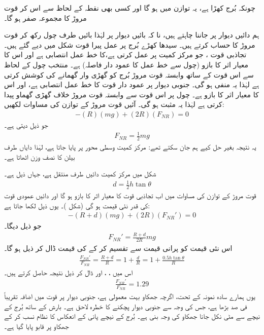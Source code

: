  چونکہ بُرج کھڑا ہے، یہ توازن میں ہو گا اور کسی بھی نقطہ کے لحاظ سے اس کر قوت مروڑ کا مجموعہ صفر ہو گا۔
 
 \quad
 ہم دائیں دیوار پر  جاننا چاہتے ہیں، نا کہ بائیں دیوار پر  لہٰذا  بائیں  طرف چول رکھ کر قوت مروڑ کا حساب کرتے ہیں۔ سیدھا کھڑے بُرج پر عمل پیرا قوت شکل  میں دیے گئے ہیں۔ تجاذبی قوت  ، جو مرکز کمیت پر عمل کرتی ہے،کا خط عمل انتصابی ہے اور اس کا معیار اثر کا بازو  (چول سے خط عمل کا عمود دار فاصلہ)     ہے۔ منتخب چول کے لحاظ سے  اس قوت کے ساتھ وابستہ قوت مروڑ بُرج کو گھڑی وار گھمانے کی کوشش کرتی ہے لہٰذا  یہ منفی ہو گی۔ جنوبی دیوار پر عمود دار قوت  کا خط عمل انتصابی ہے، اور اس کا معیار اثر کا بازو  ہے۔ چول پر  اس قوت سے وابستہ قوت مروڑ خلاف گھڑی گھماو پیدا کرتی ہے لہٰذا یہ مثبت ہو گی۔ آئیں قوت مروڑ  کے توازن کی مساوات  لکھیں:
 \begin{align*}
 -(R)(mg)+(2R)(F_{NR})=0
 \end{align*}
 جو ذیل دیتی ہے۔
 \begin{align*}
 F_{NR}=\frac{1}{2}mg
 \end{align*}
 یہ  نتیجہ بغیر حل کیے ہم جان سکتے تھے: مرکز کمیت وسطی محور پر پایا جاتا ہے، لہٰذا دایاں طرف بیلن کا  نصف وزن اٹھاتا ہے۔
 
 شکل  میں مرکز کمیت دائیں طرف منتقل  ہے، جہاں  ذیل ہے۔
 \begin{align*}
 d=\frac{1}{2}h\tan\theta
 \end{align*}
 قوت مروڑ کے توازن کی مساوات میں اب تجاذبی قوت کا معیار اثر کا بازو  ہو گا اور دائیں عمودی  قوت  کی قدر  نئی قیمت ہو گی (شکل )۔ یوں ذیل لکھا جاتا ہے:
 \begin{align*}
 -(R+d)(mg)+(2R)(F_{NR}')=0
 \end{align*}
 جو ذیل دیگا۔
 \begin{align*}
 F_{NR}'=\frac{R+d}{2R}mg
 \end{align*}
 اس نئی قیمت کو  پرانی قیمت سے تقسیم کر کے  کی قیمت ڈال کر ذیل ہو گا۔
 \begin{align*}
 \frac{F_{NR}'}{F_{NR}}=\frac{R+d}{R}=1+\frac{d}{R}=1+\frac{0.5h\tan\theta}{R}
 \end{align*}
 اس میں  ، ، اور  ڈال کر ذیل نتیجہ حاصل کرتے ہیں۔
 \begin{align*}
 \frac{F_{NR}'}{F_{NR}}=1.29
 \end{align*}
 یوں ہمارے سادہ نمونہ کے تحت، اگرچہ جھکاو بہت معمولی ہے، جنوبی دیوار پر قوت میں اضافہ تقریباً  فی صد بڑھا ہے، جس کی وجہ سے    جنوبی دیوار   پچکنے کا خطرہ لاحق ہے۔  بارش کے ساتھ بُرج کے نیچے سے   مٹی   نکل  جانا جھکاو کی وجہ بنی ہے۔ بُرج کے نیچے پانی کے انعکاس کا نظام نسب کر کے جھکاو پر قابو پایا گیا ہے۔

